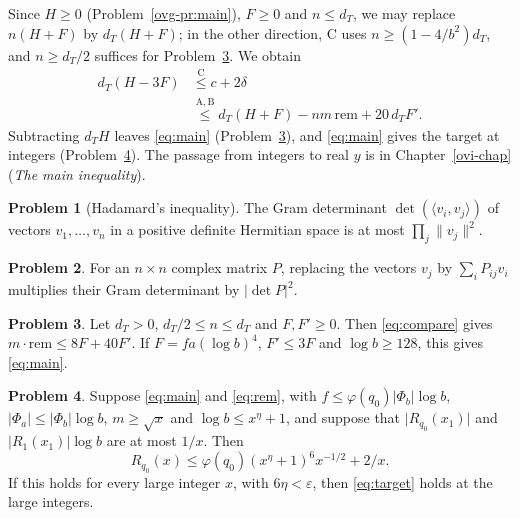 \documentclass[reqno]{amsart}
\newcounter{chap}
\theoremstyle{definition}
\newtheorem{problem}{Problem}[section]
\newcommand{\rem}{\mathrm{rem}}
\begin{document}
Since \(H \ge 0\) (Problem~\ref{ovg-pr:main}), \(F \ge 0\) and
\(n \le d_T\), we may replace \(n(H+F)\) by \(d_T(H+F)\); in the
other direction, C uses \(n \ge (1 - 4/b^2)d_T\), and
\(n \ge d_T/2\) suffices for Problem~\ref{pr:compare}.  We obtain
\begin{equation}\label{eq:compare}
  \begin{aligned}
  d_T (H - 3F)
  &\overset{\mathrm{C}}{\le} c + 2\delta \\
  &\overset{\mathrm{A, B}}{\le}
  d_T (H + F) - n m \, \rem + 20 \, d_T F' .
  \end{aligned}
\end{equation}
Subtracting \(d_T H\) leaves \eqref{eq:main}
(Problem~\ref{pr:compare}), and \eqref{eq:main} gives the target at
integers (Problem~\ref{pr:final}).  The passage from integers to
real \(y\) is in Chapter~\ref{ovi-chap} (\emph{The main inequality}).

\begin{problem}[Hadamard's inequality]\label{pr:hadamard}
  The Gram determinant \(\det(\langle v_i, v_j \rangle)\) of vectors
  \(v_1, \dots, v_n\) in a positive definite Hermitian space is at
  most \(\prod_j \lVert v_j \rVert^2\).
\end{problem}

\begin{problem}\label{pr:columns}
  For an \(n \times n\) complex matrix \(P\), replacing the vectors
  \(v_j\) by \(\sum_i P_{ij} v_i\) multiplies their Gram determinant
  by \(\lvert \det P \rvert^2\).
\end{problem}

\begin{problem}\label{pr:compare}
  Let \(d_T > 0\), \(d_T/2 \le n \le d_T\) and \(F, F' \ge 0\).  Then
  \eqref{eq:compare} gives \(m \cdot \rem \le 8F + 40F'\).  If
  \(F = f a (\log b)^4\), \(F' \le 3F\) and \(\log b \ge 128\), this
  gives \eqref{eq:main}.
\end{problem}

\begin{problem}\label{pr:final}
  Suppose \eqref{eq:main} and \eqref{eq:rem}, with
  \(f \le \varphi(q_0) \lvert \Phi_b \rvert \log b\),
  \(\lvert \Phi_a \rvert \le \lvert \Phi_b \rvert \log b\),
  \(m \ge \sqrt{x}\) and \(\log b \le x^{\eta} + 1\), and suppose
  that \(\lvert R_{q_0}(x_1) \rvert\) and
  \(\lvert R_1(x_1) \rvert \log b\) are at most \(1/x\).  Then
  \[
    R_{q_0}(x) \le \varphi(q_0) (x^{\eta} + 1)^6 x^{-1/2} + 2/x .
  \]
  If this holds for every large integer \(x\), with
  \(6\eta < \varepsilon\), then \eqref{eq:target} holds at the large
  integers.
\end{problem}
\end{document}
